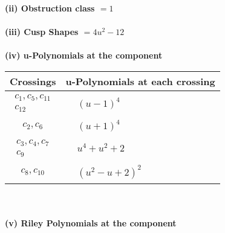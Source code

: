 \documentclass[1p]{elsarticle_modified}
\theoremstyle{definition}
\begin{document}
\flushleft \textbf{(ii) Obstruction class $= 1$}\\~\\
\flushleft \textbf{(iii) Cusp Shapes $= 4 u^2-12$}\\~\\
\newpage\renewcommand{\arraystretch}{1}
\flushleft \textbf{(iv) u-Polynomials at the component}\newline \\
\begin{tabular}{m{50pt}|m{274pt}}
Crossings & \hspace{64pt}u-Polynomials at each crossing \\
\hline $$\begin{aligned}c_{1},c_{5},c_{11}\\c_{12}\end{aligned}$$&$\begin{aligned}
&(u-1)^4
\end{aligned}$\\
\hline $$\begin{aligned}c_{2},c_{6}\end{aligned}$$&$\begin{aligned}
&(u+1)^4
\end{aligned}$\\
\hline $$\begin{aligned}c_{3},c_{4},c_{7}\\c_{9}\end{aligned}$$&$\begin{aligned}
&u^4+u^2+2
\end{aligned}$\\
\hline $$\begin{aligned}c_{8},c_{10}\end{aligned}$$&$\begin{aligned}
&(u^2- u+2)^2
\end{aligned}$\\
\hline
\end{tabular}\\~\\
\newpage\renewcommand{\arraystretch}{1}
\flushleft \textbf{(v) Riley Polynomials at the component}\newline \\
\end{document}
